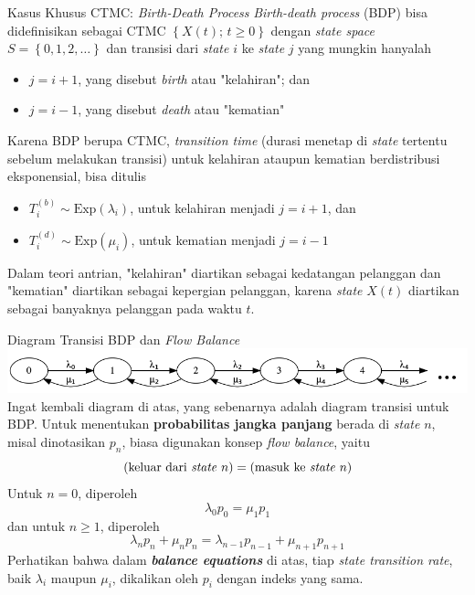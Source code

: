 \documentclass{beamer}
\newcommand{\pars}[1]{\left(#1\right)}
\newcommand{\braces}[1]{\left\{#1\right\}}
\begin{document}
\begin{frame}{Kasus Khusus CTMC: \textit{Birth-Death Process}}
    \textit{Birth-death process} (BDP) bisa didefinisikan sebagai CTMC \(\braces{X(t); \, t \ge 0 }\) dengan \textit{state space} \(S = \braces{0, 1, 2, \dots}\) dan transisi dari \textit{state} \(i\) ke \textit{state} \(j\) yang mungkin hanyalah
    \begin{itemize}
        \item \(j = i+1\), yang disebut \textit{birth} atau "kelahiran"; dan
        \item \(j = i-1\), yang disebut \textit{death} atau "kematian"
    \end{itemize}
    Karena BDP berupa CTMC, \textit{transition time} (durasi menetap di \textit{state} tertentu sebelum melakukan transisi) untuk kelahiran ataupun kematian berdistribusi eksponensial, bisa ditulis
    \begin{itemize}
        \item \(T_i^{(b)} \sim \text{Exp}\pars{\lambda_i}\), untuk kelahiran menjadi \(j = i+1\), dan
        \item \(T_i^{(d)} \sim \text{Exp}\pars{\mu_i}\), untuk kematian menjadi \(j = i-1\)
    \end{itemize}
    Dalam teori antrian, "kelahiran" diartikan sebagai kedatangan pelanggan dan "kematian" diartikan sebagai kepergian pelanggan, karena \textit{state} \(X(t)\) diartikan sebagai banyaknya pelanggan pada waktu \(t\).
\end{frame}

\begin{frame}{Diagram Transisi BDP dan \textit{Flow Balance}}
    \includegraphics[scale=0.5]{gambar/diagram_transisi_antrian.png}
    Ingat kembali diagram di atas, yang sebenarnya adalah diagram transisi untuk BDP. Untuk menentukan \textbf{probabilitas jangka panjang} berada di \textit{state} \(n\), misal dinotasikan \(p_n\), biasa digunakan konsep \textit{flow balance}, yaitu
    \[\pars{\text{keluar dari \textit{state} } n} = \pars{\text{masuk ke \textit{state} } n}\]
    Untuk \(n = 0\), diperoleh
    \[\lambda_0 p_0 = \mu_1 p_1\]
    dan untuk \(n \ge 1\), diperoleh
    \[ \lambda_n p_n + \mu_n p_n = \lambda_{n-1} p_{n-1} + \mu_{n+1} p_{n+1} \]
    Perhatikan bahwa dalam \textbf{\textit{balance equations}} di atas, tiap \textit{state transition rate}, baik \(\lambda_i\) maupun \(\mu_i\), dikalikan oleh \(p_i\) dengan indeks yang sama.
\end{frame}
\end{document}
